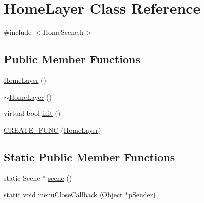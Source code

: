 \hypertarget{class_home_layer}{\section{\-Home\-Layer \-Class \-Reference}
\label{class_home_layer}
}


{\ttfamily \#include $<$\-Home\-Scene.\-h$>$}

\subsection*{\-Public \-Member \-Functions}
\begin{DoxyCompactItemize}
\item 
\hyperlink{class_home_layer_a70820b0aae19e4cf50d11413db578af6}{\-Home\-Layer} ()
\item 
\hyperlink{class_home_layer_a74c4bad7f4d90f02536645886b86529b}{$\sim$\-Home\-Layer} ()
\item 
virtual bool \hyperlink{class_home_layer_a7b39d554c7e3089a0855b471496ea0b6}{init} ()
\item 
\hyperlink{class_home_layer_ad72b3afd71127c67721d1d04aea5ffe9}{\-C\-R\-E\-A\-T\-E\-\_\-\-F\-U\-N\-C} (\hyperlink{class_home_layer}{\-Home\-Layer})
\end{DoxyCompactItemize}
\subsection*{\-Static \-Public \-Member \-Functions}
\begin{DoxyCompactItemize}
\item 
static \-Scene $\ast$ \hyperlink{class_home_layer_abfa48630fcd7c04d077c92c673d419af}{scene} ()
\item 
static void \hyperlink{class_home_layer_a1fbee493222ccf67c70396025a0af2ec}{menu\-Close\-Callback} (\-Object $\ast$p\-Sender)
\end{DoxyCompactItemize}


